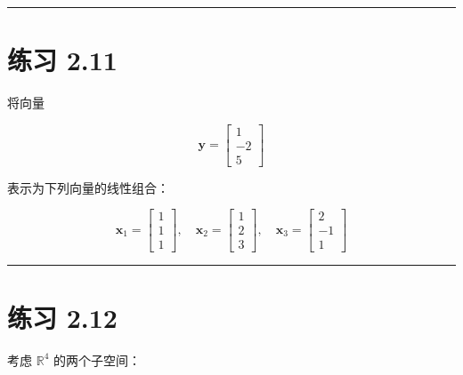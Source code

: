 \medskip\hrule\medskip

\section*{练习 2.11}

将向量

\begin{equation*}
\boldsymbol{y} = \begin{bmatrix} 1 \\ -2 \\ 5 \end{bmatrix}
\end{equation*}

表示为下列向量的线性组合：

\begin{equation*}
\boldsymbol{x}_1 = \begin{bmatrix} 1 \\ 1 \\ 1 \end{bmatrix}, \quad \boldsymbol{x}_2 = \begin{bmatrix} 1 \\ 2 \\ 3 \end{bmatrix}, \quad \boldsymbol{x}_3 = \begin{bmatrix} 2 \\ -1 \\ 1 \end{bmatrix}
\end{equation*}

\medskip\hrule\medskip

\section*{练习 2.12}

考虑 $ \mathbb{R}^4 $ 的两个子空间：

